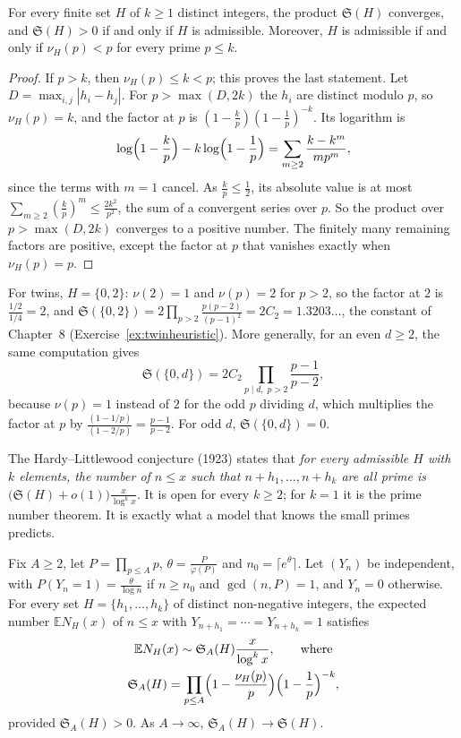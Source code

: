 \begin{proposition}\label{prop:ssconv}
For every finite set $H$ of $k\ge1$ distinct integers, the product $\mathfrak S(H)$ converges, and $\mathfrak S(H)>0$ if and only if $H$ is admissible. Moreover, $H$ is admissible if and only if $\nu_H(p)<p$
for every prime $p\le k$.
\end{proposition}

\begin{proof}
If $p>k$, then $\nu_H(p)\le k<p$; this proves the last statement. Let $D=\max_{i,j}|h_i-h_j|$. For $p>\max(D,2k)$ the $h_i$ are distinct modulo $p$, so $\nu_H(p)=k$, and the factor at $p$ is
$(1-\frac kp)(1-\frac1p)^{-k}$. Its logarithm is
\[
\log\Bigl(1-\frac kp\Bigr)-k\log\Bigl(1-\frac1p\Bigr)=\sum_{m\ge2}\frac{k-k^m}{mp^m},
\]
since the terms with $m=1$ cancel. As $\frac kp\le\frac12$, its absolute value is at most $\sum_{m\ge2}(\frac kp)^m\le\frac{2k^2}{p^2}$, the sum of a convergent series over $p$. So the product over
$p>\max(D,2k)$ converges to a positive number. The finitely many remaining factors are positive, except the factor at $p$ that vanishes exactly when $\nu_H(p)=p$.
\end{proof}

For twins, $H=\{0,2\}$: $\nu(2)=1$ and $\nu(p)=2$ for $p>2$, so the factor at $2$ is $\frac{1/2}{1/4}=2$, and $\mathfrak S(\{0,2\})=2\prod_{p>2}\frac{p(p-2)}{(p-1)^2}=2C_2=1.3203\ldots$, the constant of
Chapter~8 (Exercise~\ref{ex:twinheuristic}). More generally, for an even $d\ge2$, the same computation gives
\[
\mathfrak S(\{0,d\})=2C_2\prod_{p\mid d,\;p>2}\frac{p-1}{p-2},
\]
because $\nu(p)=1$ instead of $2$ for the odd $p$ dividing $d$, which multiplies the factor at $p$ by $\frac{(1-1/p)}{(1-2/p)}=\frac{p-1}{p-2}$. For odd $d$, $\mathfrak S(\{0,d\})=0$.

The Hardy--Littlewood conjecture (1923) states that \emph{for every admissible $H$ with $k$ elements, the number of $n\le x$ such that $n+h_1,\dots,n+h_k$ are all prime is
$\bigl(\mathfrak S(H)+o(1)\bigr)\frac x{\log^kx}$}. It is open for every $k\ge2$; for $k=1$ it is the prime number theorem. It is exactly what a model that knows the small primes predicts.

\begin{proposition}\label{prop:smallprimes}
Fix $A\ge2$, let $P=\prod_{p\le A}p$, $\theta=\frac P{\varphi(P)}$ and $n_0=\lceil e^\theta\rceil$. Let $(Y_n)$ be independent, with $P(Y_n=1)=\frac\theta{\log n}$ if $n\ge n_0$ and $\gcd(n,P)=1$, and $Y_n=0$ otherwise.
For every set $H=\{h_1,\dots,h_k\}$ of distinct non-negative integers, the expected number $\mathbb EN_H(x)$ of $n\le x$ with $Y_{n+h_1}=\cdots=Y_{n+h_k}=1$ satisfies
\[
\begin{gathered}\mathbb EN_H(x)\sim\mathfrak S_A(H)\frac x{\log^kx},\qquad\text{where}\\\mathfrak S_A(H)=\prod_{p\le A}\Bigl(1-\frac{\nu_H(p)}p\Bigr)\Bigl(1-\frac1p\Bigr)^{-k},\end{gathered}
\]
provided $\mathfrak S_A(H)>0$. As $A\to\infty$, $\mathfrak S_A(H)\to\mathfrak S(H)$.
\end{proposition}

